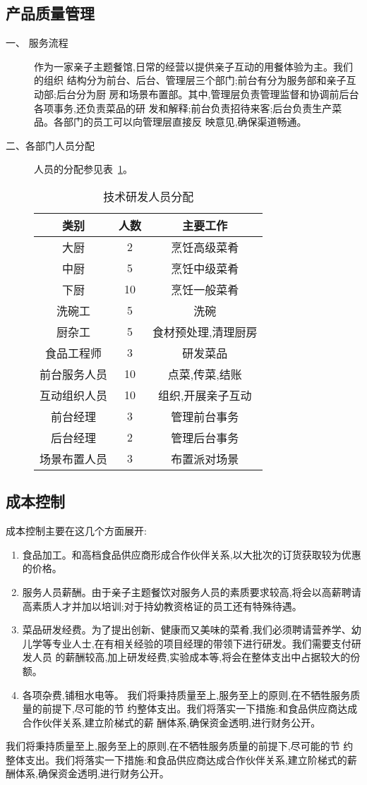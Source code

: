 \subsection{产品质量管理}
\begin{description}
\item[一、 服务流程]
作为一家亲子主题餐馆,日常的经营以提供亲子互动的用餐体验为主。我们的组织
结构分为前台、后台、管理层三个部门;前台有分为服务部和亲子互动部;后台分为厨
房和场景布置部。其中,管理层负责管理监督和协调前后台各项事务,还负责菜品的研
发和解释;前台负责招待来客;后台负责生产菜品。各部门的员工可以向管理层直接反
映意见,确保渠道畅通。

\item[二、各部门人员分配]
人员的分配参见表~\ref{table:staffs}。
\begin{table}
\centering
\caption{技术研发人员分配}
\label{table:staffs}
\begin{tabular}{|c|c|c|}
\hline
类别&人数&主要工作\\ \hline
大厨&2&烹饪高级菜肴\\ \hline
中厨&5&烹饪中级菜肴\\ \hline
下厨&10&烹饪一般菜肴\\ \hline
洗碗工&5&洗碗\\ \hline
厨杂工&5&食材预处理,清理厨房\\ \hline
食品工程师&3&研发菜品\\ \hline
前台服务人员&10&点菜,传菜,结账\\ \hline
互动组织人员&10&组织,开展亲子互动\\ \hline
前台经理&3&管理前台事务\\ \hline
后台经理&2&管理后台事务\\ \hline
场景布置人员&3&布置派对场景\\ \hline
\end{tabular}
\end{table}
\end{description}

\subsection{成本控制}
成本控制主要在这几个方面展开:
\begin{enumerate}
\item 食品加工。和高档食品供应商形成合作伙伴关系,以大批次的订货获取较为优惠
的价格。
\item 服务人员薪酬。由于亲子主题餐饮对服务人员的素质要求较高,将会以高薪聘请
高素质人才并加以培训;对于持幼教资格证的员工还有特殊待遇。
\item 菜品研发经费。为了提出创新、健康而又美味的菜肴,我们必须聘请营养学、幼
儿学等专业人士,在有相关经验的项目经理的带领下进行研发。我们需要支付研发人员
的薪酬较高,加上研发经费,实验成本等,将会在整体支出中占据较大的份额。
\item 各项杂费,铺租水电等。
我们将秉持质量至上,服务至上的原则,在不牺牲服务质量的前提下,尽可能的节
约整体支出。我们将落实一下措施:和食品供应商达成合作伙伴关系,建立阶梯式的薪
酬体系,确保资金透明,进行财务公开。
\end{enumerate}
我们将秉持质量至上,服务至上的原则,在不牺牲服务质量的前提下,尽可能的节
约整体支出。我们将落实一下措施:和食品供应商达成合作伙伴关系,建立阶梯式的薪
酬体系,确保资金透明,进行财务公开。

